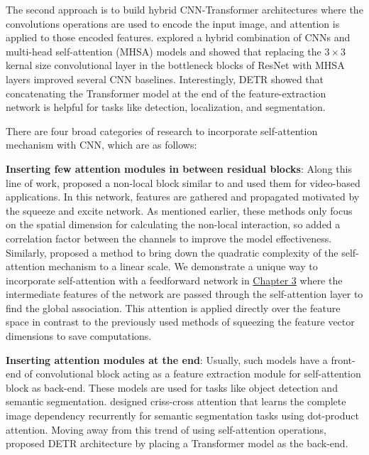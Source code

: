 The second approach is to build hybrid CNN-Transformer architectures where the convolutions operations are used to encode the input image, and attention is applied to those encoded features. \citet{srinivas2021bottleneck} explored a hybrid combination of CNNs and multi-head self-attention (MHSA) models and showed that replacing the $3\times 3$ kernal size convolutional layer in the bottleneck blocks of ResNet \citep{he2016deep} with MHSA layers improved several CNN baselines. Interestingly, DETR \citep{carion2020end} showed that concatenating the Transformer model at the end of the feature-extraction network is helpful for tasks like detection, localization, and segmentation. 


There are four broad categories of research to incorporate self-attention mechanism with CNN, which are as follows:

\textbf{Inserting few attention modules in between residual blocks}: Along this line of work, \citet{Wang_2018_CVPR,chen20182} proposed a non-local block similar to \citet{ramachandran2019stand} and used them for video-based applications. In this network, features are gathered and propagated motivated by the squeeze and excite \citep{hu2018squeeze} network. As mentioned earlier, these methods only focus on the spatial dimension for calculating the non-local interaction, so \citet{yue2018compact} added a correlation factor between the channels to improve the model effectiveness. Similarly, \citet{Shen_2021_WACV} proposed a method to bring down the quadratic complexity of the self-attention mechanism to a linear scale. We demonstrate a unique way to incorporate self-attention with a feedforward network in \hyperref[chapter1b]{Chapter 3} where the intermediate features of the network are passed through the self-attention layer to find the global association. This attention is applied directly over the feature space in contrast to the previously used methods of squeezing the feature vector dimensions to save computations. 

\textbf{Inserting attention modules at the end}: Usually, such models have a front-end of convolutional block acting as a feature extraction module for self-attention block as back-end. These models are used for tasks like object detection and semantic segmentation. \citet{huang2019ccnet} designed criss-cross attention that learns the complete image dependency recurrently for semantic segmentation tasks using dot-product attention. Moving away from this trend of using self-attention operations, \citet{carion2020end} proposed DETR architecture by placing a Transformer model as the back-end. 

